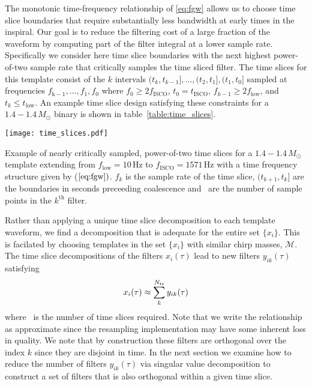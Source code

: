 The monotonic time-frequency relationship of \eqref{eq:fgw} allows us to choose
time slice boundaries that require substantially less bandwidth at early times
in the inspiral.  Our goal is to reduce the filtering cost of a large fraction
of the waveform by computing part of the filter integral at a lower sample
rate.  Specifically we consider here time slice boundaries with the next
highest power-of-two sample rate that critically samples the time sliced
filter.  The time slices for this template consist of the $k$ intervals $(t_k,
t_{k-1}], \dots, (t_2, t_1], (t_1, t_0]$ sampled at frequencies
$f_\mathrm{k-1}, \dots, f_1, f_0$ where $f_0 \geq 2 f_\mathrm{ISCO}$, $t_0 =
t_\mathrm{ISCO}$, $f_{k-1} \geqslant 2 f_\mathrm{low}$, and $t_k \leqslant
t_\mathrm{low}$. An example time slice design satisfying these constraints for
a $1.4 - 1.4 \, M_{\odot}$ binary is shown in table~\ref{table:time_slices}.
%
\begin{table}[h!]
\begin{minipage}[c]{0.52\textwidth}
\centering
\texttt{[image: time\_slices.pdf]}
\end{minipage}
\begin{minipage}[c]{0.3\textwidth}
\centering

\end{minipage}
\caption{\label{table:time_slices} Example of nearly critically sampled,
power-of-two time slices for a $1.4 - 1.4 \, M_{\odot}$ template extending from
$f_\mathrm{low} = 10 \, \mathrm{Hz}$ to $f_\mathrm{ISCO} = 1571\, \mathrm{Hz}$
with a time frequency structure given by ($\ref{eq:fgw})$. $f_k$ is the sample
rate of the time slice, $(t_{k+1}, t_k]$ are the boundaries in seconds
preceeding coalescence and \slicessamps\ are the number of sample points in the
$k^{\mathrm{th}}$ filter.}
\end{table}
%

Rather than applying a unique time slice decomposition to each template
waveform, we find a decomposition that is adequate for the entire set
$\{x_i\}$.  This is facilated by choosing templates in the set $\{x_i\}$ with
similar chirp masses, $\mathcal{M}$.  The time slice decompositions of the
filters $x_i(\tau)$ lead to new filters $y_{ik}(\tau)$ satisfying
%
\begin{equation}
\label{eq:time_slices}
x_i(\tau) \approx \sum_k^{{N}_{\mathrm{ts}}} y_{ik}(\tau)
\end{equation}
where \numslices\ is the number of time slices required.  Note that we write
the relationship as approximate since the resampling implementation may have
some inherent loss in quality.  We note that by construction these filters are
orthogonal over the index $k$ since they are disjoint in time.  In the next
section we examine how to reduce the number of filters $y_{ik}(\tau)$ via
singular value decomposition to construct a set of filters that is also
orthogonal within a given time slice.

